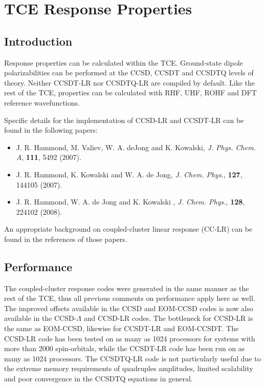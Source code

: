 \section{TCE Response Properties}

\subsection{Introduction}

Response properties can be calculated within the TCE.  Ground-state dipole polarizabilities can be performed at the CCSD, CCSDT and CCSDTQ levels of theory.  Neither CCSDT-LR nor CCSDTQ-LR are compiled by default.  Like the rest of the TCE, properties can be calculated with RHF, UHF, ROHF and DFT reference wavefunctions.

Specific details for the implementation of CCSD-LR and CCSDT-LR can be found in the following papers:
\begin{itemize}
\item J. R. Hammond, M. Valiev, W. A. deJong and K. Kowalski, \textit{J. Phys. Chem. A}, \textbf{111}, 5492 (2007).
\item J. R. Hammond, K. Kowalski and W. A. de Jong, \textit{J. Chem. Phys.}, \textbf{127}, 144105 (2007).
\item J. R. Hammond, W. A. de Jong and K. Kowalski , \textit{J. Chem. Phys.}, \textbf{128}, 224102 (2008).
\end{itemize}
An appropriate background on coupled-cluster linear response (CC-LR) can be found in the references of those papers.

\subsection{Performance}

The coupled-cluster response codes were generated in the same manner as the rest of the TCE, thus all previous comments on performance apply here as well.  The improved offsets available in the CCSD and EOM-CCSD codes is now also available in the CCSD-$\Lambda$ and CCSD-LR codes.  The bottleneck for CCSD-LR is the same as EOM-CCSD, likewise for CCSDT-LR and EOM-CCSDT.  The CCSD-LR code has been tested on as many as 1024 processors for systems with more than 2000 spin-orbitals, while the CCSDT-LR code has been run on as many as 1024 processors.  The CCSDTQ-LR code is not particularly useful due to the extreme memory requirements of quadruples amplitudes, limited scalability and poor convergence in the CCSDTQ equations in general.

